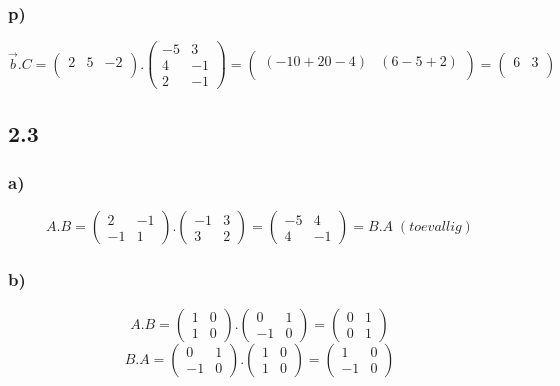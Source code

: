 \documentclass[11pt]{article}
\begin{document}
\subsubsection*{p)}
\[
\vec{b}.C=
\begin{pmatrix}
  2 & 5 & -2 \\
 \end{pmatrix}
 .
\begin{pmatrix}
  -5 & 3 \\
  4 & -1 \\
  2 & -1
 \end{pmatrix}
 =
 \begin{pmatrix}
  (-10+20-4) & (6-5+2) \\
 \end{pmatrix}
 =
 \begin{pmatrix}
  6 & 3 \\
 \end{pmatrix}
\]

\subsection*{2.3}
\subsubsection*{a)}
\[
A.B=
 \begin{pmatrix}
  2 & -1 \\
  -1 & 1
 \end{pmatrix}
 .
 \begin{pmatrix}
  -1 & 3 \\
  3 & 2
 \end{pmatrix}
 =
 \begin{pmatrix}
  -5 & 4 \\
  4 & -1
 \end{pmatrix}
 = B.A\;(toevallig)
\]
\subsubsection*{b)}
\[
A.B=
\begin{pmatrix}
1 & 0 \\
1 & 0
\end{pmatrix}
.
\begin{pmatrix}
0 & 1 \\
-1 & 0
\end{pmatrix}
=
\begin{pmatrix}
0 & 1 \\
0 & 1
\end{pmatrix}
\]
\[
B.A=
\begin{pmatrix}
0 & 1 \\
-1 & 0
\end{pmatrix}
.
\begin{pmatrix}
1 & 0 \\
1 & 0
\end{pmatrix}
=
\begin{pmatrix}
1 & 0 \\
-1 & 0
\end{pmatrix}
\]
\end{document}

